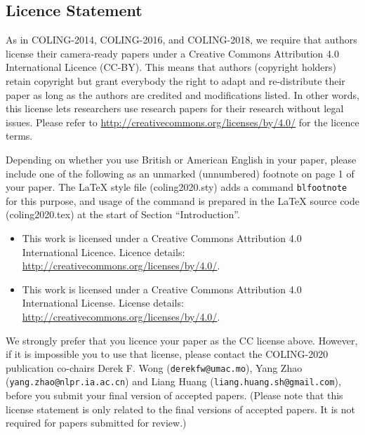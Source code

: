 \documentclass[11pt]{article}
\begin{document}
\subsection{Licence Statement}
\label{licence}

As in COLING-2014, COLING-2016, and COLING-2018,
we require that authors license their
camera-ready papers under a
Creative Commons Attribution 4.0 International Licence
(CC-BY).
This means that authors (copyright holders) retain copyright but
grant everybody 
the right to adapt and re-distribute their paper 
as long as the authors are credited and modifications listed.
In other words, this license lets researchers use research papers for their research without legal issues.
Please refer to 
\url{http://creativecommons.org/licenses/by/4.0/} for the
licence terms.  

Depending on whether you use British or American English in your
paper, please include one of the following as an unmarked
(unnumbered) footnote on page 1 of your paper.
The \LaTeX{} style file (coling2020.sty) adds a command
\texttt{blfootnote} for this purpose, and usage of the command is
prepared in the \LaTeX{} source code (coling2020.tex) at the start
of Section ``Introduction''.

\begin{itemize}
    \item  This work is licensed under a Creative Commons Attribution 4.0 International Licence. Licence details: \url{http://creativecommons.org/licenses/by/4.0/}.
           
    \item This work is licensed under a Creative Commons Attribution 4.0 International License. License details: \url{http://creativecommons.org/licenses/by/4.0/}.
           
           
           
\end{itemize}

We strongly prefer that you licence your paper as the CC license
above. However, if it is impossible you to use that license, please 
contact the COLING-2020 publication co-chairs 
Derek F. Wong (\texttt{derekfw@umac.mo}), Yang Zhao (\texttt{yang.zhao@nlpr.ia.ac.cn}) and
Liang Huang (\texttt{liang.huang.sh@gmail.com}),
before you submit your final version of accepted papers. 
(Please note that this license statement is only related to the final versions of accepted papers. 
It is not required for papers submitted for review.)
\end{document}
